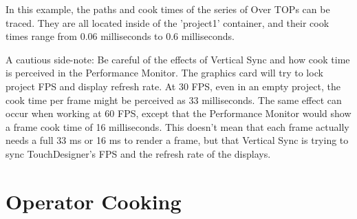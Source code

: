 \begin{fullwidth}
In this example, the paths and cook times of the series of Over TOPs can be traced. They are all located inside of the 'project1' container, and their cook times range from 0.06 milliseconds to 0.6 milliseconds.  

A cautious side-note: Be careful of the effects of Vertical Sync and how cook time is perceived in the Performance Monitor. The graphics card will try to lock project FPS and display refresh rate. At 30 FPS, even in an empty project, the cook time per frame might be perceived as 33 milliseconds. The same effect can occur when working at 60 FPS, except that the Performance Monitor would show a frame cook time of 16 milliseconds. This doesn't mean that each frame actually needs a full 33 ms or 16 ms to render a frame, but that Vertical Sync is trying to sync TouchDesigner's FPS and the refresh rate of the displays. 

\end{fullwidth}


\section{Operator Cooking}

